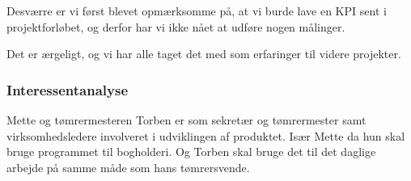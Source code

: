 \begin{table}[H]
\end{table}

Desværre er vi først blevet opmærksomme på, at vi burde lave en KPI sent i projektforløbet, og derfor har vi ikke nået at udføre nogen målinger.

Det er ærgeligt, og vi har alle taget det med som erfaringer til videre projekter.

\subsubsection{Interessentanalyse}\label{interessent}
Mette og tømrermesteren Torben er som sekretær og tømrermester samt virksomhedsledere involveret i udviklingen af produktet.
Især Mette da hun skal bruge programmet til bogholderi.
Og Torben skal bruge det til det daglige arbejde på samme måde som hans tømrersvende.

